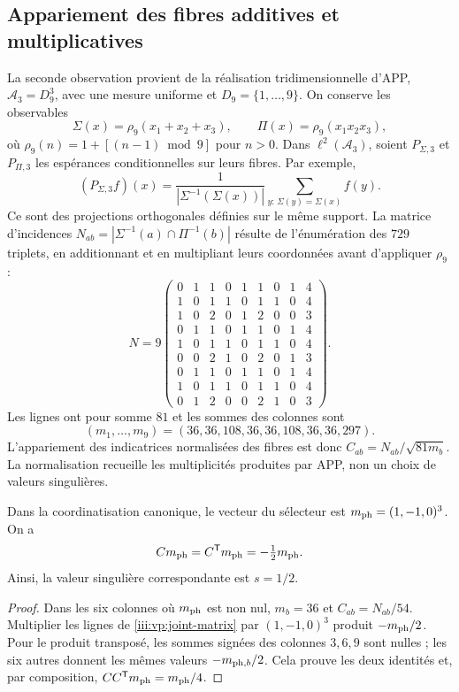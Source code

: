 \subsection{Appariement des fibres additives et multiplicatives}

La seconde observation provient de la réalisation tridimensionnelle d’APP,
$\mathcal A_3=D_9^3$, avec une mesure uniforme et
$D_9=\{1,\ldots,9\}$. On conserve les observables
\[
 \Sigma(x)=\rho_9(x_1+x_2+x_3),\qquad
 \Pi(x)=\rho_9(x_1x_2x_3),
\]
où $\rho_9(n)=1+[(n-1)\bmod9]$ pour $n>0$. Dans
$\ell^2(\mathcal A_3)$, soient $P_{\Sigma,3}$ et $P_{\Pi,3}$ les
espérances conditionnelles sur leurs fibres. Par exemple,
\[
 (P_{\Sigma,3}f)(x)=
 \frac1{|\Sigma^{-1}(\Sigma(x))|}
 \sum_{y:\,\Sigma(y)=\Sigma(x)}f(y).
\]
Ce sont des projections orthogonales définies sur le même support. La matrice
d’incidences $N_{ab}=|\Sigma^{-1}(a)\cap\Pi^{-1}(b)|$ résulte de
l’énumération des $729$ triplets, en additionnant et en multipliant leurs coordonnées avant
d’appliquer $\rho_9$ :
\begin{equation}
 N=9\begin{pmatrix}
 0&1&1&0&1&1&0&1&4\\
 1&0&1&1&0&1&1&0&4\\
 1&0&2&0&1&2&0&0&3\\
 0&1&1&0&1&1&0&1&4\\
 1&0&1&1&0&1&1&0&4\\
 0&0&2&1&0&2&0&1&3\\
 0&1&1&0&1&1&0&1&4\\
 1&0&1&1&0&1&1&0&4\\
 0&1&2&0&0&2&1&0&3
 \end{pmatrix}.
 \label{iii:vp:joint-matrix}
\end{equation}
Les lignes ont pour somme $81$ et les sommes des colonnes sont
\[
 (m_1,\ldots,m_9)=(36,36,108,36,36,108,36,36,297).
\]
L’appariement des indicatrices normalisées des fibres
est donc $C_{ab}=N_{ab}/\sqrt{81m_b}$. La normalisation recueille les
multiplicités produites par APP, non un choix de valeurs singulières.

\begin{proposition}
Dans la coordinatisation canonique, le vecteur du sélecteur est
$m_{\rm ph}=(1,-1,0)^3$. On a
\begin{equation}
 Cm_{\rm ph}=C^{\mathsf T}m_{\rm ph}=-\tfrac12m_{\rm ph}.
 \label{iii:vp:trit-mode}
\end{equation}
Ainsi, la valeur singulière correspondante est $s=1/2$.
\end{proposition}
\begin{proof}
Dans les six colonnes où $m_{\rm ph}$ est non nul, $m_b=36$ et
$C_{ab}=N_{ab}/54$. Multiplier les lignes de
\eqref{iii:vp:joint-matrix} par $(1,-1,0)^3$ produit
$-m_{\rm ph}/2$. Pour le produit transposé, les sommes signées
des colonnes $3,6,9$ sont nulles ; les six autres donnent les mêmes
valeurs $-m_{{\rm ph},b}/2$. Cela prouve les deux identités et, par
composition, $CC^{\mathsf T}m_{\rm ph}=m_{\rm ph}/4$.
\end{proof}


